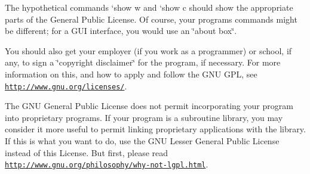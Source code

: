 The hypothetical commands `show w\textquotesingle{} and `show c\textquotesingle{} should show the appropriate parts of the General Public License. Of course, your program\textquotesingle{}s commands might be different; for a G\+U\+I interface, you would use an \char`\"{}about box\char`\"{}.

You should also get your employer (if you work as a programmer) or school, if any, to sign a \char`\"{}copyright disclaimer\char`\"{} for the program, if necessary. For more information on this, and how to apply and follow the G\+N\+U G\+P\+L, see \href{http://www.gnu.org/licenses/}{\tt http\+://www.\+gnu.\+org/licenses/}.

The G\+N\+U General Public License does not permit incorporating your program into proprietary programs. If your program is a subroutine library, you may consider it more useful to permit linking proprietary applications with the library. If this is what you want to do, use the G\+N\+U Lesser General Public License instead of this License. But first, please read \href{http://www.gnu.org/philosophy/why-not-lgpl.html}{\tt http\+://www.\+gnu.\+org/philosophy/why-\/not-\/lgpl.\+html}. 